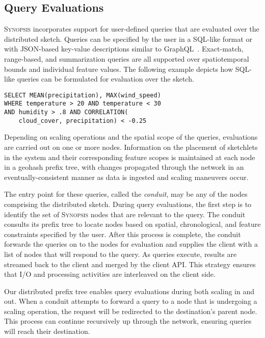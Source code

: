\subsection{Query Evaluations}
\label{subsec:query-eval}
\textsc{Synopsis} incorporates support for user-defined queries that are evaluated over the distributed sketch.  Queries can be specified by the user in a SQL-like format or with JSON-based key-value descriptions similar to GraphQL~\cite{graphql}. Exact-match, range-based, and summarization queries are all supported over spatiotemporal bounds and individual feature values. The following example depicts how SQL-like queries can be formulated for evaluation over the sketch.

\begin{verbatim}
SELECT MEAN(precipitation), MAX(wind_speed)
WHERE temperature > 20 AND temperature < 30
AND humidity > .8 AND CORRELATION(
    cloud_cover, precipitation) < -0.25
\end{verbatim}

Depending on scaling operations and the spatial scope of the queries, evaluations are carried out on one or more nodes. Information on the placement of sketchlets in the system and their corresponding feature scopes is maintained at each node in a geohash prefix tree, with changes propagated through the network in an eventually-consistent manner as data is ingested and scaling maneuvers occur.

The entry point for these queries, called the \emph{conduit}, may be any of the nodes comprising the distributed sketch. During query evaluations, the first step is to identify the set of \textsc{Synopsis} nodes that are relevant to the query. The conduit consults its prefix tree to locate nodes based on spatial, chronological, and feature constraints specified by the user. After this process is complete, the conduit forwards the queries on to the nodes for evaluation and supplies the client with a list of nodes that will respond to the query. As queries execute, results are streamed back to the client and merged by the client API. This strategy ensures that I/O and processing activities are interleaved on the client side.

Our distributed prefix tree enables query evaluations during both scaling in and out. When a conduit attempts to forward a query to a node that is undergoing a scaling operation, the request will be redirected to the destination's parent node. This process can continue recursively up through the network, ensuring queries will reach their destination.

